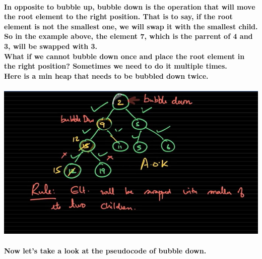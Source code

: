 \documentclass{article}
\begin{document}
\paragraph{In opposite to bubble up, bubble down is the operation that will move the root element to the right position.
That is to say, if the root element is not the smallest one, we will swap it with the smallest child.
So in the example above, the element 7, which is the parrent of 4 and 3, will be swapped with 3.\\
What if we cannot bubble down once and place the root element in the right position? Sometimes we need to do it multiple times.\\
Here is a min heap that needs to be bubbled down twice.\\}


\includegraphics[width=\textwidth]{bubbledownmultipletimes}



\paragraph{Now let's take a look at the pseudocode of bubble down.\\}
\end{document}
